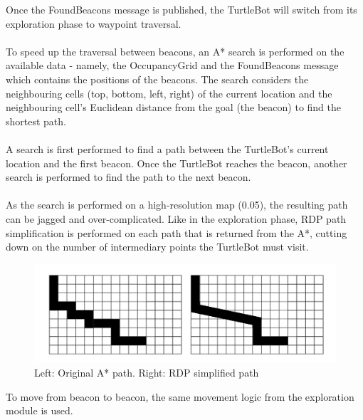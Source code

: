 \documentclass[titlepage,12pt,a4paper]{article}
\begin{document}
Once the FoundBeacons message is published, the TurtleBot will switch from its exploration phase to waypoint traversal.\\
\\
To speed up the traversal between beacons, an A* search is performed on the available data - namely, the OccupancyGrid and the FoundBeacons message which contains the positions of the beacons. The search considers the neighbouring cells (top, bottom, left, right) of the current location and the neighbouring cell's Euclidean distance from the goal (the beacon) to find the shortest path. \\
\\
A search is first performed to find a path between the TurtleBot's current location and the first beacon. Once the TurtleBot reaches the beacon, another search is performed to find the path to the next beacon.\\
\\
As the search is performed on a high-resolution map (0.05), the resulting path can be jagged and over-complicated. Like in the exploration phase, RDP path simplification is performed on each path that is returned from the A*, cutting down on the number of intermediary points the TurtleBot must visit.\\

\begin{figure}[h]
  	\begin{center}
	\includegraphics[scale=0.27]{rdpExample.jpg}
	\caption{Left: Original A* path. Right: RDP simplified path}
	\end{center}
\end{figure}

To move from beacon to beacon, the same movement logic from the exploration module is used.


\pagebreak
\end{document}
